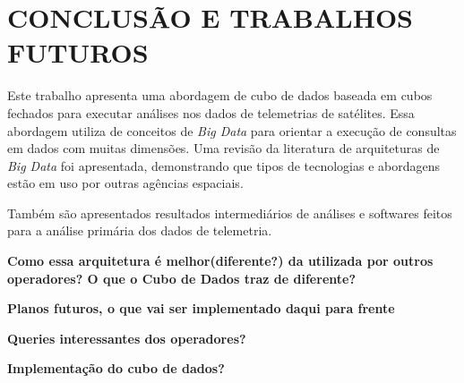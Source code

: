 
\chapter{CONCLUSÃO E TRABALHOS FUTUROS}

Este trabalho apresenta uma abordagem de cubo de dados baseada em cubos fechados para executar análises nos dados de telemetrias de satélites. Essa abordagem utiliza de conceitos de \textit{Big Data} para orientar a execução de consultas em dados com muitas dimensões. Uma revisão da literatura de arquiteturas de \textit{Big Data} foi apresentada, demonstrando que tipos de tecnologias e abordagens estão em uso por outras agências espaciais.

Também são apresentados resultados intermediários de análises e softwares feitos para a análise primária dos dados de telemetria. 

\textbf{Como essa arquitetura é melhor(diferente?) da utilizada por outros operadores? O que o Cubo de Dados traz de diferente?}

\textbf{Planos futuros, o que vai ser implementado daqui para frente}

\textbf{Queries interessantes dos operadores?}

\textbf{Implementação do cubo de dados?}

